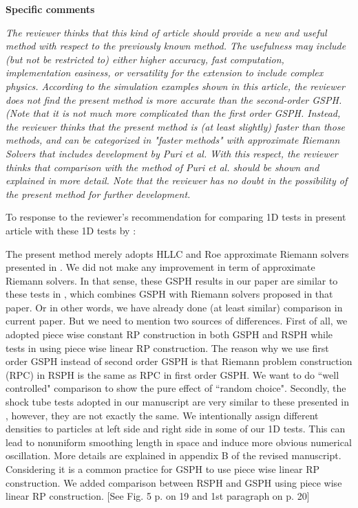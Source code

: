 \documentclass[10pt,a4paper]{article}
\begin{document}
\textbf{\large Specific comments}

\textit{The reviewer thinks that this kind of article should provide a new and useful method with respect to the previously known method. The usefulness may include (but not be restricted to) either higher accuracy, fast computation, implementation easiness, or versatility for the extension to include complex physics. According to the simulation examples shown in this article, the reviewer does not find the present method is more accurate than the second-order GSPH. (Note that it is not much more complicated than the first order GSPH. Instead, the reviewer thinks that the present method is (at least slightly) faster than those methods, and can be categorized in "faster methods" with approximate Riemann Solvers that includes development by Puri et al. With this respect, the reviewer thinks that comparison with the method of Puri et al. should be shown and explained in more detail. Note that the reviewer has no doubt in the
possibility of the present method for further development.}

To response to the reviewer's recommendation for comparing 1D tests in present article with these 1D tests by \citet{puri2014approximate}:

The present method merely adopts HLLC and Roe approximate Riemann solvers presented in \citep{puri2014approximate}. We did not make any improvement in term of approximate Riemann solvers. In that sense, these GSPH results in our paper are similar to these tests in \citep{puri2014approximate}, which combines GSPH with Riemann solvers proposed in that paper. Or in other words, we have already done (at least similar) comparison in current paper.
But we need to mention two sources of differences. First of all, we adopted piece wise constant RP construction in both GSPH and RSPH while tests in \citep{puri2014approximate} using piece wise linear RP construction. The reason why we use first order GSPH instead of second order GSPH is that Riemann problem construction (RPC) in RSPH is the same as RPC in first order GSPH. We want to do ``well controlled" comparison to show the pure effect of ``random choice". Secondly, the shock tube tests adopted in our manuscript are very similar to these presented in \citep{puri2014approximate}, however, they are not exactly the same. We intentionally assign different densities to particles at left side and right side in some of our 1D tests. This can lead to nonuniform smoothing length in space and induce more obvious numerical oscillation. More details are explained in appendix B of the revised manuscript.
Considering it is a common practice for GSPH to use piece wise linear RP construction.
We added comparison between RSPH and GSPH using  piece wise linear RP construction. 
[See Fig. 5 p. on 19 and 1st paragraph on p. 20]
\end{document}
